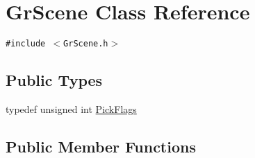 \hypertarget{class_gr_scene}{
\section{GrScene Class Reference}
\label{class_gr_scene}
}
{\tt \#include $<$GrScene.h$>$}

\subsection*{Public Types}
\begin{CompactItemize}
\item 
typedef unsigned int \hyperlink{class_gr_scene_7645ba831bfac8f4543f59ff7b2c63bd}{PickFlags}
\end{CompactItemize}
\subsection*{Public Member Functions}
